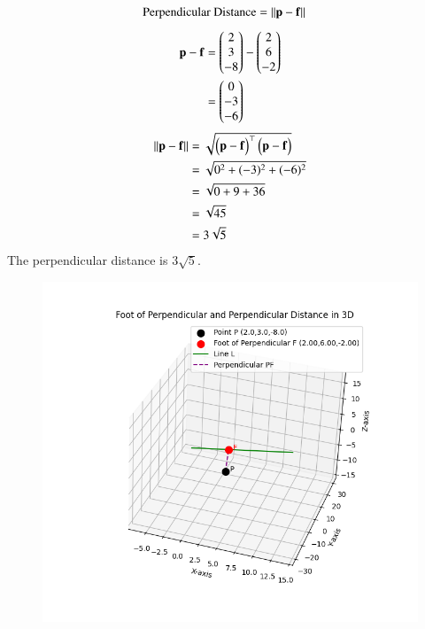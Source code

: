 \documentclass[journal]{IEEEtran}
\begin{document}
\begin{align}
\text{Perpendicular Distance} &= \left\lVert\mathbf{p}-\mathbf{f}\right\rVert
\end{align}
\begin{align}
\mathbf{p}-\mathbf{f} &= \begin{pmatrix}2 \\ 3 \\ -8\end{pmatrix} - \begin{pmatrix}2 \\ 6 \\ -2\end{pmatrix} \\
&=\begin{pmatrix}0 \\ -3 \\ -6\end{pmatrix}
\end{align}
\begin{align}
\left\lVert\mathbf{p}-\mathbf{f}\right\rVert &= \sqrt{\begin{pmatrix}\mathbf{p}-\mathbf{f}\end{pmatrix}^\top \begin{pmatrix}\mathbf{p}-\mathbf{f}\end{pmatrix}} \\
&= \sqrt{0^2 + (-3)^2 + (-6)^2} \\
&= \sqrt{0 + 9 + 36} \\
&= \sqrt{45} \\
&= 3\sqrt{5}
\end{align}
The perpendicular distance is $3\sqrt{5}$.
\begin{figure}[H]
\centering
\includegraphics[width=0.8\columnwidth]{figs/fig2.png}
\caption{}
\label{fig:1}
\end{figure}
\end{document}
